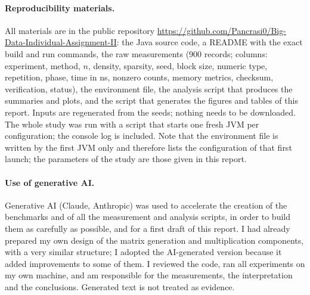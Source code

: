 \documentclass[11pt,a4paper]{article}
\newcommand{\repourl}{\url{https://github.com/Pancrasi0/Big-Data-Individual-Assignment-II}}
\begin{document}
\paragraph{Reproducibility materials.} All materials are in the public repository \repourl: the Java source code, a README with the exact build and run commands, the raw measurements (900 records; columns: experiment, method, $n$, density, sparsity, seed, block size, numeric type, repetition, phase, time in ns, nonzero counts, memory metrics, checksum, verification, status), the environment file, the analysis script that produces the summaries and plots, and the script that generates the figures and tables of this report. Inputs are regenerated from the seeds; nothing needs to be downloaded. The whole study was run with a script that starts one fresh JVM per configuration; the console log is included. Note that the environment file is written by the first JVM only and therefore lists the configuration of that first launch; the parameters of the study are those given in this report.

\paragraph{Use of generative AI.} Generative AI (Claude, Anthropic) was used to accelerate the creation of the benchmarks and of all the measurement and analysis scripts, in order to build them as carefully as possible, and for a first draft of this report. I had already prepared my own design of the matrix generation and multiplication components, with a very similar structure; I adopted the AI-generated version because it added improvements to some of them. I reviewed the code, ran all experiments on my own machine, and am responsible for the measurements, the interpretation and the conclusions. Generated text is not treated as evidence.
\end{document}
